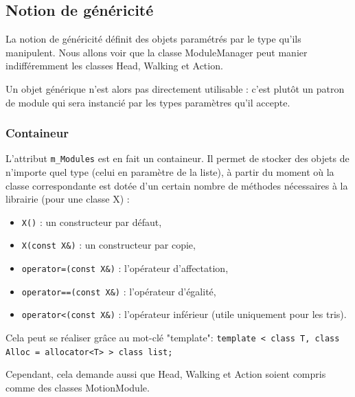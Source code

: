 \documentclass[conference]{IEEEtran}
\begin{document}
\subsection{Notion de généricité}

La notion de généricité définit des objets paramétrés par le type qu'ils manipulent. Nous allons voir que la classe ModuleManager peut manier indifféremment les classes Head, Walking et Action.

Un objet générique n'est alors pas directement utilisable : c'est plutôt un patron de module qui sera instancié par les types paramètres qu'il accepte.





\subsubsection{Containeur}
L'attribut \lstinline{m_Modules} est en fait un containeur. Il permet de stocker des objets de n'importe quel type (celui en paramètre de la liste), à partir du moment où la classe correspondante est dotée d'un certain nombre de méthodes nécessaires à la librairie  (pour une classe X) :
\begin{itemize}
    \item \lstinline{X()} : un constructeur par défaut,
    \item \lstinline{X(const X&)} : un constructeur par copie,
    \item \lstinline{operator=(const X&)} : l'opérateur d'affectation,
    \item \lstinline{operator==(const X&)} : l'opérateur d'égalité,
    \item \lstinline{operator<(const X&)} : l'opérateur inférieur (utile uniquement pour les tris).
\end{itemize}
Cela peut se réaliser grâce au mot-clé "template":
\lstinline{template < class T, class Alloc = allocator<T> > class list;}

Cependant, cela demande aussi que Head, Walking et Action soient compris comme des classes MotionModule.

\end{document}

